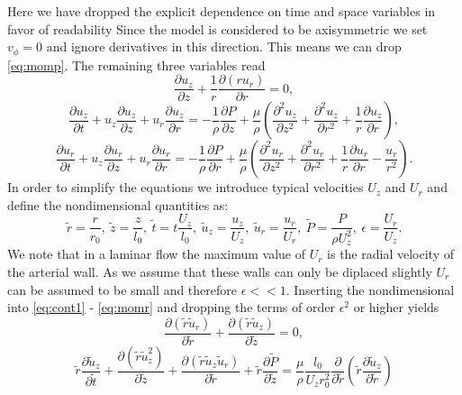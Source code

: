 \documentclass[a4paper, oneside]{discothesis}
\begin{document}
Here we have dropped the explicit dependence on time and space variables in favor of readability
Since the model is considered to be axisymmetric we set $v_\phi=0$ and ignore derivatives in this direction.
This means we can drop \autoref{eq:momp}.
The remaining three variables read
\begin{equation}
	\frac{\partial u_z}{\partial z} + \frac{1}{r} \frac{\partial (r u_r)}{\partial r} = 0, \label{eq:cont1}
\end{equation}
\begin{equation}
	\frac{\partial u_z}{\partial t} + u_z \frac{\partial u_z}{\partial z} + u_r \frac{\partial u_z}{\partial r} = -\frac{1}{\rho} \frac{\partial P}{\partial z} + \frac{\mu}{\rho} \left( \frac{\partial^2 u_z}{\partial z^2} + \frac{\partial^2 u_z}{\partial r^2} + \frac{1}{r} \frac{\partial u_z}{\partial r} \right),
\end{equation}
\begin{equation}
	\frac{\partial u_r}{\partial t} + u_z \frac{\partial u_r}{\partial z} + u_r \frac{\partial u_r}{\partial r} = -\frac{1}{\rho} \frac{\partial P}{\partial r} + \frac{\mu}{\rho} \left( \frac{\partial^2 u_r}{\partial z^2} + \frac{\partial^2 u_r}{\partial r^2} + \frac{1}{r} \frac{\partial u_r}{\partial r} - \frac{u_r}{r^2}\right). \label{eq:momr}
\end{equation}
In order to simplify the equations we introduce typical velocities $U_z$ and $U_r$ and define the nondimensional quantities as:
\begin{equation}
	\tilde{r} = \frac{r}{r_0}, \ \tilde{z} = \frac{z}{l_0}, \ \tilde{t} = t \frac{U_z}{l_0}, \ \tilde{u}_z = \frac{u_z}{U_z}, \ \tilde{u}_r = \frac{u_r}{U_r}, \ \tilde{P} = \frac{P}{\rho U_z^2}, \ \epsilon = \frac{U_r}{U_z}.
\end{equation}
We note that in a laminar flow the maximum value of $U_r$ is the radial velocity of the arterial wall.
As we assume that these walls can only be diplaced slightly $U_r$ can be assumed to be small and therefore $\epsilon << 1$. \cite{womersley1957elastic}
Inserting the nondimensional into \autoref{eq:cont1} - \autoref{eq:momr} and dropping the terms of order $\epsilon^2$ or higher yields
\begin{equation}
	\frac{\partial (\tilde{r} \tilde{u}_r)}{\partial \tilde{r}} + \frac{\partial (\tilde{r} \tilde{u}_z)}{\partial\tilde{z}} = 0, \label{eq:cont2}
\end{equation}
\begin{equation}
	\tilde{r} \frac{\partial \tilde{u}_z}{\partial \tilde{t}} + \frac{ \partial (\tilde{r} \tilde{u}_z^2)}{\partial \tilde{z}} + \frac{ \partial (\tilde{r} \tilde{u}_z \tilde{u}_r)}{\partial \tilde{r}} + \tilde{r} \frac{\partial \tilde{P}}{\partial \tilde{z}} = \frac{\mu}{\rho} \frac{l_0}{U_z r_0^2} \frac{\partial}{\partial \tilde{r}} \left( \tilde{r} \frac{\partial \tilde{u}_z}{\partial \tilde{r}} \right) \label{eq:momz}
\end{equation}
\end{document}
